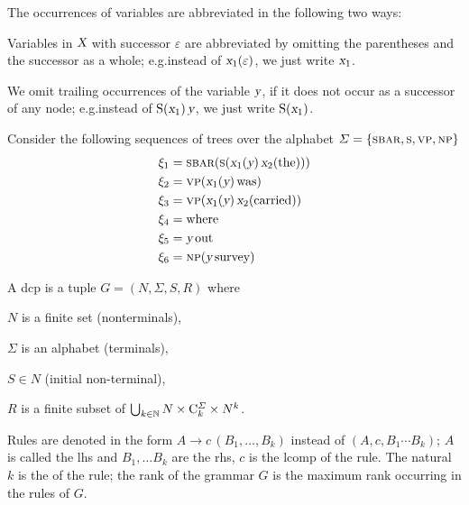 \documentclass[../document.tex]{subfiles}
\begin{document}
    The occurrences of variables are abbreviated in the following two ways:
    \begin{compactenum}
        \item Variables in \(\textsl{X}\) with successor \(\varepsilon\) are abbreviated by omitting the parentheses and the successor as a whole; e.g.\@ instead of \(\textsl{x}_1(\varepsilon)\), we just write \(\textsl{x}_1\).
        \item We omit trailing occurrences of the variable \(\textsl{y}\), if it does not occur as a successor of any node; e.g.\@ instead of \(\text{S}(\textsl{x}_1)\,\textsl{y} \), we just write \(\text{S}(\textsl{x}_1)\).
    \end{compactenum}

    \begin{example}
        Consider the following sequences of trees over the alphabet \(\varSigma = \{ \textsc{sbar}, \textsc{s}, \textsc{vp}, \textsc{np} \}\)
        \begin{align*}
            \xi_1 &= \textsc{sbar} (\textsc{s} (\textsl{x}_1(\textsl{y}) \, \textsl{x}_2(\text{the}))) \\
            \xi_2 &= \textsc{vp}(\textsl{x}_1(\textsl{y}) \, \text{was}) \\
            \xi_3 &= \textsc{vp}(\textsl{x}_1(\textsl{y}) \, \textsl{x}_2(\text{carried}))\\
            \xi_4 &= \text{where}\\
            \xi_5 &= \textsl{y} \, \text{out} \\
            \xi_6 &= \textsc{np} (\textsl{y} \, \text{survey}) \\
        \end{align*}
    \end{example}

    \begin{definition}
    A \gls{dcp} is a tuple \(G=(N, \varSigma, S, R)\) where
    \begin{compactenum}[(i)]
        \item \(N\) is a finite set (\glspl{nonterminal}),
        \item \(\varSigma\) is an alphabet (\glspl{terminal}),
        \item \(S \in N\) (initial non-terminal),
        \item \(R\) is a finite subset of \(\bigcup_{k \in \mathbb{N}} N \times \mathrm{C}^\varSigma_k \times N^k\).
    \end{compactenum}

    Rules are denoted in the form \(A \to c\,(B_1, \ldots, B_k)\) instead of \((A, c, B_1 \cdots B_k)\); \(A\) is called the \gls{lhs} and \(B_1, \ldots B_k\) are the \gls{rhs}, \(c\) is the \gls*{lcomp} of the \gls*{rule}.
    The natural \(k\) is the  of the rule; the \gls*{rank} of the grammar \(G\) is the maximum rank occurring in the rules of \(G\).
    \end{definition}
\end{document}
